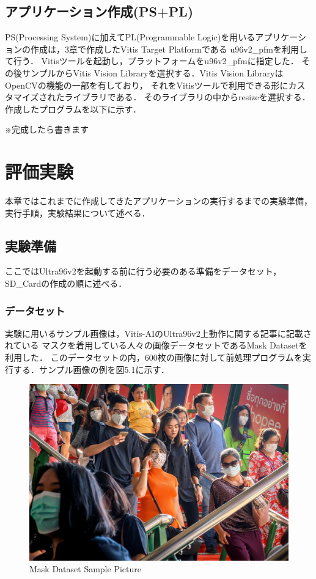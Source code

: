 \documentclass[11pt,a4j]{jreport}
\begin{document}
\section{アプリケーション作成(PS+PL)}
PS(Processing System)に加えてPL(Programmable Logic)を用いるアプリケーションの作成は，3章で作成したVitis Target Platformである
u96v2_pfmを利用して行う．
Vitisツールを起動し，プラットフォームをu96v2_pfmに指定した．
その後サンプルからVitis Vision Libraryを選択する．Vitis Vision LibraryはOpenCVの機能の一部を有しており，
それをVitisツールで利用できる形にカスタマイズされたライブラリである．
そのライブラリの中からresizeを選択する．作成したプログラムを以下に示す．

※完成したら書きます

%
%
%
\chapter{評価実験}
本章ではこれまでに作成してきたアプリケーションの実行するまでの実験準備，実行手順，実験結果について述べる．
\section{実験準備}
ここではUltra96v2を起動する前に行う必要のある準備をデータセット，SD_Cardの作成の順に述べる．
\subsection{データセット}
実験に用いるサンプル画像は，Vitis-AIのUltra96v2上動作に関する記事\cite{SamplePictWeb}に記載されている
マスクを着用している人々の画像データセットであるMask Dataset\cite{SamplePictDrive}を利用した．
このデータセットの内，600枚の画像に対して前処理プログラムを実行する．サンプル画像の例を図5.1に示す．
\begin{figure}[H]
  \center
  \includegraphics[scale = 0.17]{pict/Mask_1.jpg}
  \caption{Mask Dataset Sample Picture}
\end{figure}
\end{document}
